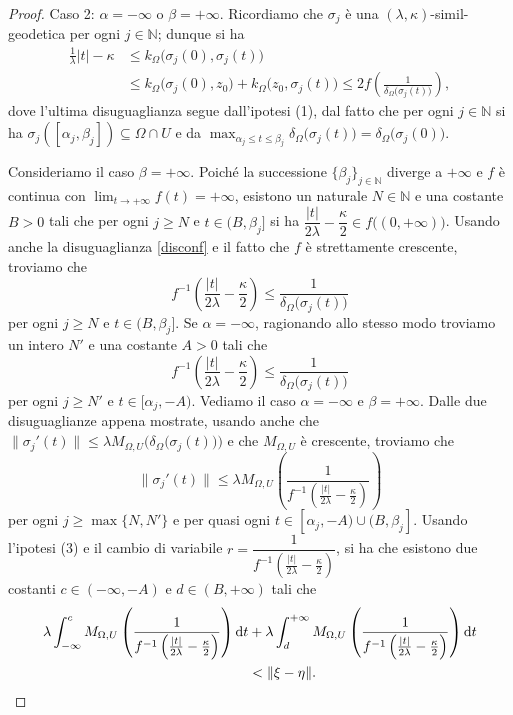 \begin{proof}
    Caso 2: $\alpha=-\infty$ o $\beta=+\infty$. Ricordiamo che $\sigma_j$ è una $(\lambda,\kappa)$-simil-geodetica per ogni $j\in\mathbb{N}$; dunque si ha
    \begin{equation}\label{disconf}
        \begin{aligned}
            \frac{1}{\lambda}|t|-\kappa&\le k_\Omega\big(\sigma_j(0),\sigma_j(t)\big)\\
            &\le k_\Omega\big(\sigma_j(0),z_0\big)+k_\Omega\big(z_0,\sigma_j(t)\big) \le 2f\left(\frac{1}{\delta_\Omega\big(\sigma_j(t)\big)}\right),
        \end{aligned}
    \end{equation}
    dove l'ultima disuguaglianza segue dall'ipotesi (1), dal fatto che per ogni $j\in\mathbb{N}$ si ha $\sigma_j([\alpha_j,\beta_j])\subseteq\Omega\cap U$ e da $\displaystyle\max_{\alpha_j\le t\le \beta_j}\delta_\Omega\big(\sigma_j(t)\big)=\delta_\Omega\big(\sigma_j(0)\big)$.

    Consideriamo il caso $\beta=+\infty$. Poiché la successione $\{\beta_j\}_{j\in\mathbb{N}}$ diverge a $+\infty$ e $f$ è continua con $\displaystyle\lim_{t\longrightarrow+\infty}f(t)=+\infty$, esistono un naturale $N\in\mathbb{N}$ e una costante $B>0$ tali che per ogni $j\ge N$ e $t\in(B,\beta_j]$ si ha $\dfrac{|t|}{2\lambda}-\dfrac{\kappa}{2}\in f\big((0,+\infty)\big)$. Usando anche la disuguaglianza \eqref{disconf} e il fatto che $f$ è strettamente crescente, troviamo che
    $$f^{-1}\left(\frac{|t|}{2\lambda}-\frac{\kappa}{2}\right) \le \frac{1}{\delta_\Omega\big(\sigma_j(t)\big)}$$
    per ogni $j\ge N$ e $t\in(B,\beta_j]$. Se $\alpha=-\infty$, ragionando allo stesso modo troviamo un intero $N'$ e una costante $A>0$ tali che
    $$f^{-1}\left(\frac{|t|}{2\lambda}-\frac{\kappa}{2}\right) \le \frac{1}{\delta_\Omega\big(\sigma_j(t)\big)}$$
    per ogni $j\ge N'$ e $t\in[\alpha_j,-A)$. Vediamo il caso $\alpha=-\infty$ e $\beta=+\infty$. Dalle due disuguaglianze appena mostrate, usando anche che $\|\sigma_j'(t)\| \le \lambda M_{\Omega,U}\Big(\delta_\Omega\big(\sigma_j(t)\big)\Big)$ e che $M_{\Omega,U}$ è crescente, troviamo che
    $$\|\sigma_j'(t)\| \le \lambda M_{\Omega,U}\left(\frac{1}{f^{-1}\left(\frac{|t|}{2\lambda}-\frac{\kappa}{2}\right)}\right)$$
    per ogni $j\ge\max\{N,N'\}$ e per quasi ogni $t\in[\alpha_j,-A)\cup(B,\beta_j]$. Usando l'ipotesi (3) e il cambio di variabile $r=\dfrac{1}{f^{-1}\left(\frac{|t|}{2\lambda}-\frac{\kappa}{2}\right)}$, si ha che esistono due costanti $c\in(-\infty,-A)$ e $d\in(B,+\infty)$ tali che
    \begin{align*}
        \lambda\int_{-\infty}^c M_{\Omega,U}\left(\frac{1}{f^{-1}\left(\frac{|t|}{2\lambda}-\frac{\kappa}{2}\right)}\right)\mathop{}\!\mathrm{d} t&+\lambda\int_d^{+\infty}M_{\Omega,U}\left(\frac{1}{f^{-1}\left(\frac{|t|}{2\lambda}-\frac{\kappa}{2}\right)}\right)\mathop{}\!\mathrm{d} t\\
        &<\|\xi-\eta\|.
    \end{align*}


\end{proof}
